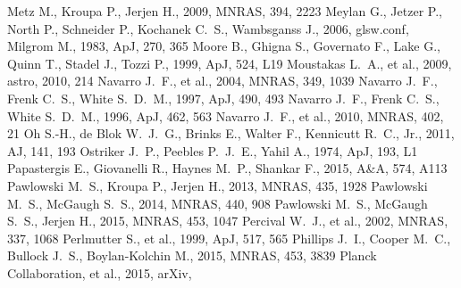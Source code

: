 \documentclass[a4wide,12pt]{book}
\begin{document}
\begin{thebibliography}{}
 Metz M., Kroupa P., Jerjen H., 2009, MNRAS, 394, 2223
Meylan G., Jetzer P., North P., Schneider P., Kochanek C.~S., Wambsganss 
J., 2006, glsw.conf,  
Milgrom M., 1983, ApJ, 270, 365 
Moore B., Ghigna S., Governato F., Lake G., Quinn T., Stadel J., Tozzi P., 
1999, ApJ, 524, L19 
 Moustakas L.~A., et al., 2009, astro, 
2010, 214 
 Navarro J.~F., et al., 2004, MNRAS, 349, 
1039
 Navarro J.~F., Frenk C.~S., White S.~D.~M., 1997, ApJ, 490, 493
 Navarro J.~F., Frenk C.~S., White S.~D.~M., 1996, ApJ, 462, 563 
 Navarro J.~F., et al., 2010, MNRAS, 402, 
21
 Oh 
S.-H., de Blok W.~J.~G., Brinks E., Walter F., Kennicutt R.~C., Jr., 2011, 
AJ, 141, 193 
 Ostriker J.~P., Peebles P.~J.~E., Yahil A., 1974, ApJ, 193, L1 
 Papastergis E., Giovanelli R., Haynes M.~P., Shankar F., 2015, A\&A, 574, A113 
 Pawlowski M.~S., Kroupa P., Jerjen H., 2013, MNRAS, 435, 1928 
 Pawlowski M.~S., McGaugh S.~S., 2014, MNRAS, 440, 908 
 Pawlowski M.~S., McGaugh S.~S., Jerjen H., 2015, MNRAS, 453, 1047 
 Percival W.~J., et al., 2002, MNRAS, 337, 
1068 
 Perlmutter S., et al., 1999, ApJ, 517, 565 
 Phillips J.~I., Cooper M.~C., Bullock 
J.~S., Boylan-Kolchin M., 2015, MNRAS, 453, 3839 
 Planck Collaboration, et al., 2015, arXiv, 

\end{thebibliography}
\end{document}
